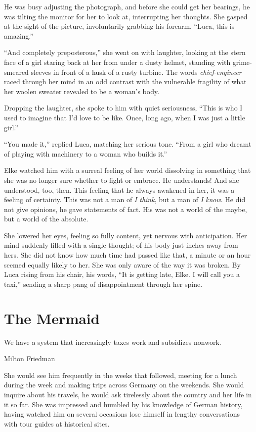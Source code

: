 He was busy adjusting the photograph, and before she could get her bearings, he was tilting the monitor for her to look at, interrupting her thoughts. She gasped at the sight of the picture, involuntarily grabbing his forearm. ``Luca, this is amazing.''

``And completely preposterous,'' she went on with laughter, looking at the stern face of a girl staring back at her from under a dusty helmet, standing with grime-smeared sleeves in front of a husk of a rusty turbine. The words \emph{chief-engineer} raced through her mind in an odd contrast with the vulnerable fragility of what her woolen sweater revealed to be a woman's body.

Dropping the laughter, she spoke to him with quiet seriousness, ``This is who I used to imagine that I'd love to be like. Once, long ago, when I was just a little girl.''

``You made it,'' replied Luca, matching her serious tone. ``From a girl who dreamt of playing with machinery to a woman who builds it.''

Elke watched him with a surreal feeling of her world dissolving in something that she was no longer sure whether to fight or embrace. He understands! And she understood, too, then. This feeling that he always awakened in her, it was a feeling of certainty. This was not a man of \emph{I think}, but a man of \emph{I know}. He did not give opinions, he gave statements of fact. His was not a world of the maybe, but a world of the absolute.

She lowered her eyes, feeling so fully content, yet nervous with anticipation. Her mind suddenly filled with a single thought; of his body just inches away from hers. She did not know how much time had passed like that, a minute or an hour seemed equally likely to her. She was only aware of the way it was broken. By Luca rising from his chair, his words, ``It is getting late, Elke. I will call you a taxi,'' sending a sharp pang of disappointment through her spine.

\chapter{The Mermaid}

\epigraph{We have a system that increasingly taxes work and subsidizes nonwork.}{Milton Friedman}

\firstparagraph

She would see him frequently in the weeks that followed, meeting for a lunch during the week and making trips across Germany on the weekends. She would inquire about his travels, he would ask tirelessly about the country and her life in it so far. She was impressed and humbled by his knowledge of German history, having watched him on several occasions lose himself in lengthy conversations with tour guides at historical sites.

